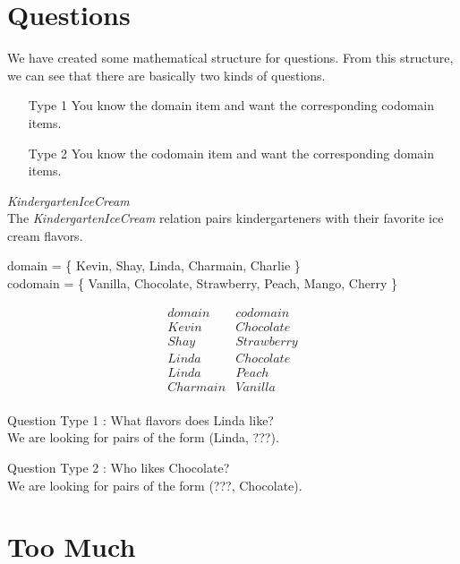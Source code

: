 \documentclass{ximera}
\begin{document}
\section{Questions}


We have created some mathematical structure for questions. From this structure, we can see that there are basically two kinds of questions.

\begin{itemize}
\item [Type 1] You know the domain item and want the corresponding codomain items.
\item [Type 2] You know the codomain item and want the corresponding domain items.
\end{itemize}



\begin{example} \textit{KindergartenIceCream} \\
The \textit{KindergartenIceCream} relation pairs kindergarteners with their favorite ice cream flavors.

domain = \{ Kevin, Shay, Linda, Charmain, Charlie \}  \\
codomain = \{ Vanilla, Chocolate, Strawberry, Peach, Mango, Cherry \} 

\[
\begin{array}{l|l}
    domain      & codomain      \\ \hline
    Kevin   &  Chocolate \\
    Shay   & Strawberry \\
    Linda  &  Chocolate \\
    Linda  &  Peach \\
    Charmain &  Vanilla \\ 
\end{array}
\]


Question Type 1 : What flavors does Linda like? \\
We are looking for pairs of the form (Linda, ???).

Question Type 2 : Who likes Chocolate? \\
We are looking for pairs of the form (???, Chocolate).

\end{example} 



\section{Too Much}
\end{document}
